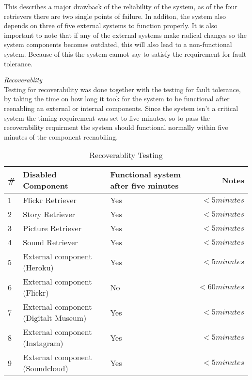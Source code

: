 This describes a major drawback of the reliability of the system, as of the four retrievers there are two single points of failure. In additon, the system also depends on three of five external systems to function properly. It is also important to note that if any of the external systems make radical changes so the system components becomes outdated, this will also lead to a non-functional system. Because of this the system cannot say to satisfy the requirement for fault tolerance.

\emph{Recoverablity}\\

Testing for recoverability was done together with the testing for fault tolerance, by taking the time on how long it took for the system to be functional after reenabling an external or internal components. Since the system isn't a critical system the timing requirement was set to five minutes, so to pass the recoverability requirment the system should functional normally within five minutes of the component reenabiling. 

\begin{table}[!htp]
\begin{center}
	\begin{tabular}{ | l | l | p{3.7cm} | r | }
	\hline
	\#	&Disabled Component	&Functional system  after five minutes	& Notes \\ \hline
	1	&Flickr Retriever		&Yes			& $<5 minutes$ \\ \hline
	2	&Story Retriever		&Yes			& $<5 minutes$\\ \hline
	3	&Picture Retriever	&Yes			& $<5 minutes$\\ \hline
	4	&Sound Retriever	&Yes			& $<5 minutes$\\ \hline
	5	&External component (Heroku)	&Yes			& $<5 minutes$\\ \hline
	6	&External component (Flickr)	&No			& $<60 minutes$\\ \hline
	7	&External component (Digitalt Museum)	&Yes		& $<5 minutes$\\ \hline
	8	&External component (Instagram)	&Yes			& $<5 minutes$\\ \hline
	9	&External component (Soundcloud)	&Yes			& $<5 minutes$\\ \hline
	 \hline
	 \end{tabular}
\end{center}
\caption{Recoverablity Testing}
\label{tab:Recoverablity Testing}
\end{table}

